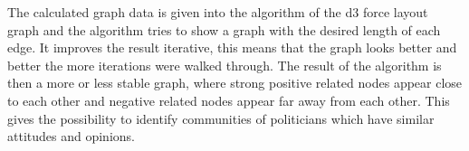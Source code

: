 The calculated graph data is given into the algorithm of the d3 force layout graph and the algorithm tries to show a graph with the desired length of each edge. It improves the result iterative, this means that the graph looks better and better the more iterations were walked through. The result of the algorithm is then a more or less stable graph, where strong positive related nodes appear close to each other and negative related nodes appear far away from each other. This gives the possibility to identify communities of politicians which have similar attitudes and opinions.

